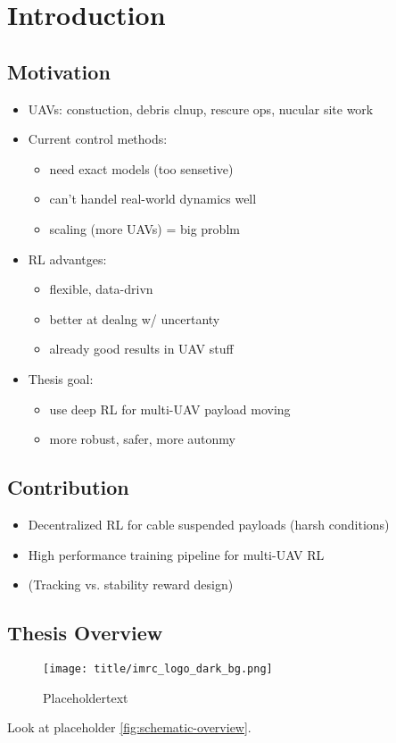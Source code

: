 \chapter{Introduction}

\section{Motivation}
\begin{itemize}
    \item UAVs: constuction, debris clnup, rescure ops, nucular site work
    
    \item Current control methods:
    \begin{itemize}
        \item need exact models (too sensetive)
        \item can't handel real-world dynamics well
        \item scaling (more UAVs) = big problm
    \end{itemize}
    
    \item RL advantges:
    \begin{itemize}
        \item flexible, data-drivn
        \item better at dealng w/ uncertanty
        \item already good results in UAV stuff
    \end{itemize}
    
    \item Thesis goal:
    \begin{itemize}
        \item use deep RL for multi-UAV payload moving
        \item more robust, safer, more autonmy
    \end{itemize}
\end{itemize}
\section{Contribution}
\begin{itemize}
    \item Decentralized RL for cable suspended payloads (harsh conditions)
    \item High performance training pipeline for multi-UAV RL
    \item (Tracking vs. stability reward design)
\end{itemize}
\section{Thesis Overview}
\begin{figure}
    \centering
    \texttt{[image: title/imrc\_logo\_dark\_bg.png]}
    \caption{Placeholdertext}
    \label{fig:schematic-overview}
\end{figure}
Look at placeholder \autoref{fig:schematic-overview}.